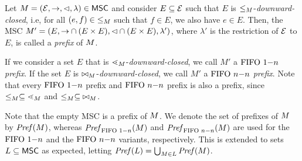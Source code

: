 \begin{definition}[Prefix]
	Let $M = (\mathcal{E},\to,\lhd,\lambda) \in \mathsf{MSC}$ and consider
	$E \subseteq \mathcal{E}$ such that $E$ is ${\le_M}$-\emph{downward-closed}, i.e,
	for all $(e,f) \in {\le_M}$ such that $f \in E$, we also have $e \in E$.
	Then, the MSC $M' = (E,{\to} \cap (E \times E),{\lhd} \cap (E \times E),\lambda')$,
	where $\lambda'$ is the restriction of $\mathcal{E}$ to $E$, is called a \emph{prefix}
	of $M$. 	
\end{definition}

If we consider a set $E$ that is ${\lessdot_M}$-\emph{downward-closed}, we call $M'$ a \emph{$\text{FIFO } 1\mathsf{-}n$ prefix}.
If the set $E$ is ${\bowtie_M}$-\emph{downward-closed}, we call $M'$ a \emph{$\text{FIFO } n\mathsf{-}n$ prefix}. Note that every $\text{FIFO } 1\mathsf{-}n$ prefix and $\text{FIFO } n\mathsf{-}n$ prefix is also a prefix, since $\le_M \subseteq {\lessdot_M}$ and $\le_M \subseteq {\bowtie_M}$.

Note that the empty MSC is a prefix of $M$.
We denote the set of prefixes of $M$ by $\mathit{Pref}(M)$, whereas $\mathit{Pref}_{\text{FIFO } 1\mathsf{-}n}(M)$ and $\mathit{Pref}_{\text{FIFO } n\mathsf{-}n}(M)$ are used for the $\text{FIFO } 1\mathsf{-}n$ and the $\text{FIFO } n\mathsf{-}n$ variants, respectively.
This is extended to sets $L \subseteq \mathsf{MSC}$ as expected, letting
$\mathit{Pref}(L) = \bigcup_{M \in L} \mathit{Pref}(M)$.

\begin{comment}

Let $\msc = (\Events,\procrel,\lhd,\lambda) \in \MSCs$ and consider
$E \subseteq \Events$ such that $E$ is ${\le_\msc}$-\emph{downward-closed}, i.e,
for all $(e,f) \in {\le_\msc}$ such that $f \in E$, we also have $e \in E$.
Then, the MSC $(E,{\procrel} \cap (E \times E),{\lhd} \cap (E \times E),\lambda')$,
where $\lambda'$ is the restriction of $\Events$ to $E$, is called a \emph{prefix}
of $\msc$. In particular, the empty MSC is a prefix of $\msc$.
We denote the set of prefixes of $\msc$ by $\Pref{\msc}$.
This is extended to sets $L \subseteq \MSCs$ as expected, letting
$\Pref{L} = \bigcup_{\msc \in L} \Pref{\msc}$.

\smallskip

Let $\msc = (\Events,\procrel,\lhd,\lambda) \in \onenMSCs$ and consider
$E \subseteq \Events$ such that $E$ is ${\lessdot_\msc}$-\emph{downward-closed}, i.e,
for all $(e,f) \in {\lessdot_\msc}$ such that $f \in E$, we also have $e \in E$.
Then, the MSC $(E,{\procrel} \cap (E \times E),{\lhd} \cap (E \times E),\lambda')$,
where $\lambda'$ is the restriction of $\Events$ to $E$, is called a \emph{$\onen$ prefix} of $\msc$. We denote the set of $\onen$ prefixes of $\msc$ by $\Prefonen{\msc}$.

\smallskip

Let $\msc = (\Events,\procrel,\lhd,\lambda) \in \nnMSCs$ and consider
$E \subseteq \Events$ such that $E$ is ${\bowtie_\msc}$-\emph{downward-closed}, i.e,
for all $(e,f) \in {\bowtie_\msc}$ such that $f \in E$, we also have $e \in E$.
Then, the MSC $(E,{\procrel} \cap (E \times E),{\lhd} \cap (E \times E),\lambda')$,
where $\lambda'$ is the restriction of $\Events$ to $E$, is called a \emph{$\nn$ prefix} of $\msc$. We denote the set of $\nn$ prefixes of $\msc$ by $\Prefnn{\msc}$.

\end{comment}

